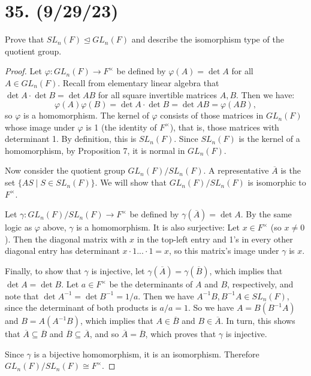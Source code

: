 \documentclass{article}
\begin{document}
\section*{35. (9/29/23)}

Prove that $SL_n(F) \unlhd GL_n(F)$ and describe the isomorphism type of the quotient group.

\begin{proof}
    Let $\varphi: GL_n(F) \rightarrow F^\times$ be defined by $\varphi(A) = \det A$ for all $A \in GL_n(F)$. Recall from elementary linear algebra that $\det A \cdot \det B = \det AB$ for all square invertible matrices $A, B$. Then we have:
    \begin{equation*}
        \varphi(A)\varphi(B) = \det A \cdot \det B = \det AB = \varphi(AB),
    \end{equation*}
    so $\varphi$ is a homomorphism. The kernel of $\varphi$ consists of those matrices in $GL_n(F)$ whose image under $\varphi$ is 1 (the identity of $F^\times$), that is, those matrices with determinant 1. By definition, this is $SL_n(F)$. Since $SL_n(F)$ is the kernel of a homomorphism, by Proposition 7, it is normal in $GL_n(F)$.

    Now consider the quotient group $GL_n(F) / SL_n(F)$. A representative $\overline{A}$ is the set $\{ AS \mid S \in SL_n(F) \}$. We will show that $GL_n(F) / SL_n(F)$ is isomorphic to $F^\times$.

    Let $\gamma: GL_n(F) / SL_n(F) \rightarrow F^\times$ be defined by $\gamma(\overline{A}) = \det A$. By the same logic as $\varphi$ above, $\gamma$ is a homomorphism. It is also surjective: Let $x \in F^\times$ (so $x \neq 0$). Then the diagonal matrix with $x$ in the top-left entry and 1's in every other diagonal entry has determinant $x \cdot 1 ... \cdot 1 = x$, so this matrix's image under $\gamma$ is $x$.

    Finally, to show that $\gamma$ is injective, let $\gamma(\overline{A}) = \gamma(\overline{B})$, which implies that $\det A = \det B$. Let $a \in F^\times$ be the determinants of $A$ and $B$, respectively, and note that $\det A^{-1} = \det B^{-1} = 1/a$. Then we have $A^{-1}B, B^{-1}A \in SL_n(F)$, since the determinant of both products is $a/a = 1$. So we have $A = B(B^{-1}A)$ and $B = A(A^{-1}B)$, which implies that $A \in \overline{B}$ and $B \in \overline{A}$. In turn, this shows that $\overline{A} \subseteq \overline{B}$ and $\overline{B} \subseteq \overline{A}$, and so $\overline{A} = \overline{B}$, which proves that $\gamma$ is injective.

    Since $\gamma$ is a bijective homomorphism, it is an isomorphism. Therefore $GL_n(F) / SL_n(F) \cong F^\times$.
\end{proof}
\end{document}
